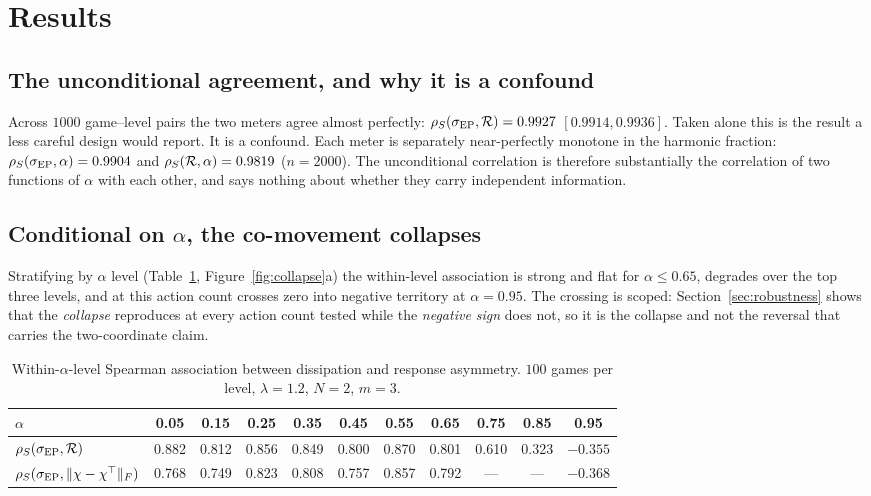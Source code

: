 \section{Results}
\label{sec:results}

\subsection{The unconditional agreement, and why it is a confound}
Across $1000$ game--level pairs the two meters agree almost perfectly:
$\rho_S(\sigma_{\mathrm{EP}},\mathcal{R})=0.9927$ $[0.9914,0.9936]$. Taken alone this is the result a less careful
design would report. It is a confound. Each meter is separately near-perfectly monotone in
the harmonic fraction: $\rho_S(\sigma_{\mathrm{EP}},\alpha)=0.9904$ and $\rho_S(\mathcal{R},\alpha)=0.9819$
($n=2000$). The unconditional correlation is therefore substantially the correlation of two
functions of $\alpha$ with each other, and says nothing about whether they carry independent
information.

\subsection{Conditional on \texorpdfstring{$\alpha$}{alpha}, the co-movement collapses}
\label{sec:collapse}
Stratifying by $\alpha$ level (Table~\ref{tab:collapse}, Figure~\ref{fig:collapse}a) the
within-level association is strong and flat for $\alpha\le0.65$, degrades over the top three
levels, and at this action count crosses zero into negative territory at $\alpha=0.95$. The
crossing is scoped: Section~\ref{sec:robustness} shows that the \emph{collapse} reproduces
at every action count tested while the \emph{negative sign} does not, so it is the collapse
and not the reversal that carries the two-coordinate claim.

\begin{table}[H]
\caption{Within-$\alpha$-level Spearman association between dissipation and response
asymmetry. $100$ games per level, $\lambda=1.2$, $N=2$, $m=3$.}
\label{tab:collapse}
\small
\begin{tabular}{lcccccccccc}
\toprule
$\alpha$ & 0.05 & 0.15 & 0.25 & 0.35 & 0.45 & 0.55 & 0.65 & 0.75 & 0.85 & 0.95 \\
\midrule
$\rho_S(\sigma_{\mathrm{EP}},\mathcal{R})$ & 0.882 & 0.812 & 0.856 & 0.849 & 0.800 & 0.870 & 0.801 & 0.610 & 0.323 & $-0.355$ \\
$\rho_S(\sigma_{\mathrm{EP}},\|\chi-\chi^{\top}\|_F)$ & 0.768 & 0.749 & 0.823 & 0.808 & 0.757 & 0.857 & 0.792 & --- & --- & $-0.368$ \\
\bottomrule
\end{tabular}
\end{table}

